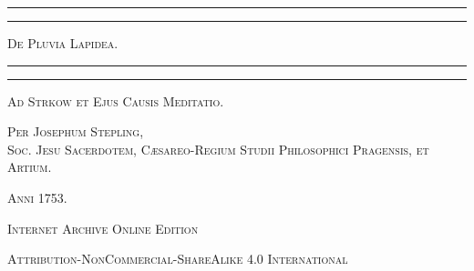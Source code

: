 \documentclass[a4paper, 11pt, oneside, polutonikogreek, latin]{article}
\begin{document}
\begin{titlepage} %
	\centering %

	
	\rule{\textwidth}{1.6pt}\vspace*{-\baselineskip}\vspace*{2pt} %
	\rule{\textwidth}{0.4pt} %
	
	\vspace{1\baselineskip} %
	
	{\scshape\Huge De Pluvia Lapidea.}
	
	\vspace{1\baselineskip} %

	\rule{\textwidth}{0.4pt}\vspace*{-\baselineskip}\vspace{3.2pt} %
	\rule{\textwidth}{1.6pt} %
	
	\vspace{1\baselineskip} %
	
	
	{\scshape \Large Ad Strkow et Ejus Causis Meditatio.} %
	
	\vspace*{1\baselineskip} %
	
        {\scshape Per Josephum Stepling,\\Soc. Jesu Sacerdotem, Cæsareo-Regium Studii Philosophici Pragensis, et Artium. } %
    
        \vspace*{\fill}

	\vspace{1\baselineskip}

	{\small\scshape Anni 1753.}
	
	{\small\scshape{}}
	
	\vspace{0.5\baselineskip} %

        \scshape Internet Archive Online Edition  %
	
	{\scshape\small Attribution-NonCommercial-ShareAlike 4.0 International} %
\end{titlepage}
\setlength{\parskip}{1mm plus1mm minus1mm}
\clearpage
\tableofcontents
\clearpage
\Large
\pagestyle{fancy}
\fancyhf{}
\cfoot{\bfseries{\thepage}}
\end{document}
